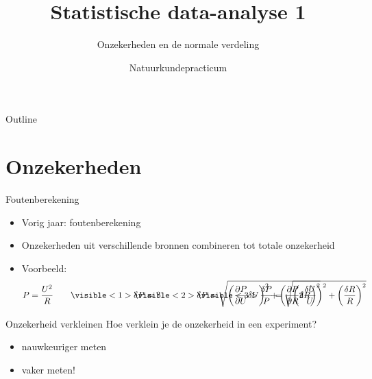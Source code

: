 \documentclass{beamer}
\title{Statistische data-analyse 1}
\subtitle{Onzekerheden en de normale verdeling}
\author{Natuurkundepracticum}
\institute{
  Vrije Universiteit / Universiteit van Amsterdam
}
\date{}
\begin{document}
\begin{frame}
  \titlepage
\end{frame}

\begin{frame}{Outline}
  \tableofcontents
\end{frame}




\section{Onzekerheden}

\begin{frame}{Foutenberekening}
  \begin{itemize}
    \item Vorig jaar: foutenberekening
    \item Onzekerheden uit verschillende bronnen combineren tot totale onzekerheid
    \item Voorbeeld:
    \begin{equation*}
        P = \frac{U^2}{R} \qquad
        \visible<1>
        {\mathrlap{\delta P = \ ?}}
        \visible<2>
        {\mathrlap{\delta P = \sqrt{\left(\frac{\partial P}{\partial U}\delta U\right)^2 + \left(\frac{\partial P}{\partial R}\delta R\right)^2}}}
        \visible<3>
        {\frac{\delta P}{P} = \sqrt{\left(2\frac{\delta U}{U}\right)^2 + \left(\frac{\delta R}{R}\right)^2}}
    \end{equation*}
  \end{itemize}
\end{frame}

\begin{frame}{Onzekerheid verkleinen}
  Hoe verklein je de onzekerheid in een experiment?
  \begin{itemize}
    \item nauwkeuriger meten
    \item<2-> \alert{vaker} meten!
  \end{itemize}
\end{frame}
\end{document}
